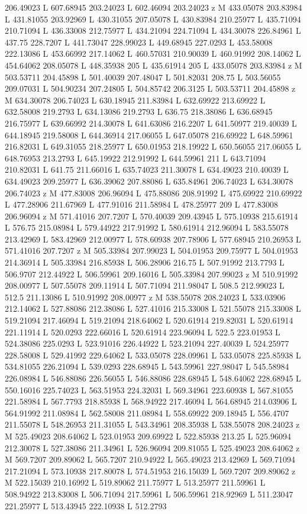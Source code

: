 {\begin{scope}[local bounding box=bb]
{206.49023 L 607.68945 203.24023 L 602.46094 203.24023 z M 433.05078 203.83984 L 431.81055 203.92969 L 430.31055 207.05078 L 430.83984 210.25977 L 435.71094 210.71094 L 436.33008 212.75977 L 434.21094 224.71094 L 434.30078 226.84961 L 437.75 228.7207 L 441.73047 228.99023 L 449.68945 227.0293 L 453.58008 222.13086 L 453.66992 217.14062 L 460.57031 210.90039 L 460.91992 208.14062 L 454.64062 208.05078 L 448.35938 205 L 435.61914 205 L 433.05078 203.83984 z M 503.53711 204.45898 L 501.40039 207.48047 L 501.82031 208.75 L 503.56055 209.07031 L 504.90234 207.24805 L 504.85742 206.3125 L 503.53711 204.45898 z M 634.30078 206.74023 L 630.18945 211.83984 L 632.69922 213.69922 L 632.58008 219.2793 L 634.13086 219.2793 L 636.75 218.38086 L 636.68945 216.75977 L 639.66992 214.30078 L 641.63086 216.2207 L 641.50977 219.40039 L 644.18945 219.58008 L 644.36914 217.06055 L 647.05078 216.69922 L 648.59961 216.82031 L 649.31055 218.25977 L 650.01953 218.19922 L 650.56055 217.06055 L 648.76953 213.2793 L 645.19922 212.91992 L 644.59961 211 L 643.71094 210.82031 L 641.75 211.66016 L 635.74023 211.30078 L 634.49023 210.40039 L 634.49023 209.25977 L 636.39062 207.88086 L 635.84961 206.74023 L 634.30078 206.74023 z M 477.83008 206.96094 L 475.88086 208.91992 L 475.69922 210.69922 L 477.28906 211.67969 L 477.91016 211.58984 L 478.25977 209 L 477.83008 206.96094 z M 571.41016 207.7207 L 570.40039 209.43945 L 575.10938 215.61914 L 576.75 215.08984 L 579.44922 217.91992 L 580.61914 212.96094 L 583.55078 213.42969 L 583.42969 212.00977 L 578.60938 207.78906 L 577.68945 210.26953 L 571.41016 207.7207 z M 505.33984 207.99023 L 504.01953 209.75977 L 504.01953 214.36914 L 505.33984 216.85938 L 506.28906 216.75 L 507.91992 213.7793 L 506.9707 212.44922 L 506.59961 209.16016 L 505.33984 207.99023 z M 510.91992 208.00977 L 507.55078 209.11914 L 507.71094 211.98047 L 508.5 212.99023 L 512.5 211.13086 L 510.91992 208.00977 z M 538.55078 208.24023 L 533.03906 212.14062 L 527.88086 212.38086 L 527.41016 215.33008 L 521.55078 215.33008 L 519.21094 217.46094 L 519.21094 218.64062 L 520.61914 219.82031 L 520.61914 221.11914 L 520.0293 222.66016 L 520.61914 223.96094 L 522.5 223.01953 L 524.38086 225.0293 L 523.91016 226.44922 L 523.21094 227.40039 L 524.25977 228.58008 L 529.41992 229.64062 L 533.05078 228.09961 L 533.05078 225.85938 L 534.81055 226.21094 L 539.0293 228.68945 L 543.59961 227.98047 L 545.58984 226.08984 L 546.88086 226.56055 L 546.88086 228.68945 L 548.64062 228.68945 L 550.16016 225.74023 L 563.51953 224.32031 L 569.34961 223.60938 L 567.81055 221.58984 L 567.7793 218.85938 L 568.94922 217.46094 L 564.68945 214.03906 L 564.91992 211.08984 L 562.58008 211.08984 L 558.69922 209.18945 L 556.4707 211.55078 L 548.26953 211.31055 L 543.34961 208.35938 L 538.55078 208.24023 z M 525.49023 208.64062 L 523.01953 209.69922 L 522.85938 213.25 L 525.96094 212.30078 L 527.38086 211.34961 L 526.96094 209.81055 L 525.49023 208.64062 z M 569.7207 209.89062 L 565.7207 210.94922 L 565.49023 213.42969 L 569.71094 217.21094 L 573.10938 217.80078 L 574.51953 216.15039 L 569.7207 209.89062 z M 522.15039 210.16992 L 519.89062 211.75977 L 513.25977 211.59961 L 508.94922 213.83008 L 506.71094 217.59961 L 506.59961 218.92969 L 511.23047 221.25977 L 513.43945 222.10938 L 512.2793 }
\end{scope}}

